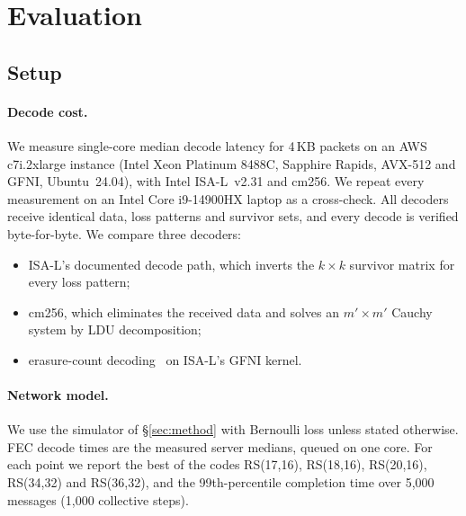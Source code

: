 
\section{Evaluation}
\label{sec:eval}

\subsection{Setup}

\paragraph{Decode cost.} We measure single-core median decode latency for 4\,KB packets on an
AWS c7i.2xlarge instance (Intel Xeon Platinum 8488C, Sapphire Rapids, AVX-512 and GFNI,
Ubuntu~24.04), with Intel ISA-L~v2.31 and cm256. We repeat every measurement on an Intel Core
i9-14900HX laptop as a cross-check. All decoders receive identical data, loss patterns and survivor sets, and every
decode is verified byte-for-byte. We compare three decoders:
\begin{itemize}
  \item ISA-L's documented decode path, which inverts the $k\times k$ survivor matrix for every loss pattern;
  \item cm256, which eliminates the received data and solves an $m'\times m'$ Cauchy system by LDU decomposition;
  \item erasure-count decoding~\cite{li2005patent} on ISA-L's GFNI kernel.
\end{itemize}

\paragraph{Network model.} We use the simulator of \S\ref{sec:method} with Bernoulli loss unless
stated otherwise. FEC decode times are the measured server medians, queued on one core. For each
point we report the best of the codes RS(17,16), RS(18,16), RS(20,16), RS(34,32) and RS(36,32),
and the 99th-percentile completion time over 5{,}000 messages (1{,}000 collective steps).

